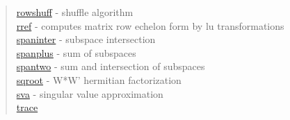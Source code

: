 \begin{quote}
\hyperlink{rowshuff}{rowshuff} - {shuffle algorithm} \\  
\hyperlink{rref}{rref} - {computes  matrix row echelon form by lu transformations} \\  
\hyperlink{spaninter}{spaninter} - {subspace intersection} \\  
\hyperlink{spanplus}{spanplus} - {sum of subspaces} \\  
\hyperlink{spantwo}{spantwo} - {sum and intersection of subspaces} \\  
\hyperlink{sqroot}{sqroot} - {W*W' hermitian factorization} \\  
\hyperlink{sva}{sva} - {singular value approximation} \\  
\hyperlink{trace}{trace}
\end{quote}





























